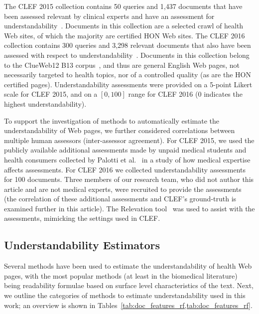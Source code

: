 \documentclass[10pt,a4paper]{article}
\begin{document}
The CLEF 2015 collection contains 50 queries and 1,437 documents that have been assessed relevant by clinical experts and have an assessment for understandability~\cite{clef15}. Documents in this collection are a selected crawl of health Web sites, of which the majority are certified HON Web sites.
The CLEF 2016 collection contains 300 queries and 3,298 relevant documents that also have been assessed with respect to understandability~\cite{clef16}. Documents in this collection belong to the ClueWeb12 B13 corpus~\cite{clueweb12}, and thus are general English Web pages, not necessarily targeted to health topics, nor of a controlled quality (as are the HON certified pages). 
Understandability assessments were provided on a 5-point Likert scale for CLEF 2015, and on a $[0,100]$ range for CLEF 2016 (0 indicates the highest understandability). 

To support the investigation of methods to automatically estimate the understandability of Web pages, 
we further considered correlations between multiple human assessors (inter-assessor agreement). For CLEF 2015, we used the publicly available additional assessments made by unpaid medical students and health consumers collected by Palotti et al.~\cite{palotti16b} in a study of how medical expertise affects assessments. For CLEF 2016 we  collected understandability assessments for 100 documents. 
Three members of our research team, who did not author this article and are not medical experts, were recruited to provide the assessments (the correlation of these additional assessments and CLEF's ground-truth is examined further in this article).
The Relevation tool~\cite{koopman14} was used to assist with the assessments, mimicking the settings used in CLEF. 


\subsection*{Understandability Estimators}
\label{sec:proxies}

Several methods have been used to estimate the understandability of health Web pages, with the most popular methods (at least in the biomedical literature) being readability formulae based on surface level characteristics of the text. Next, we outline the categories of methods to estimate understandability used in this work; an overview is shown in Tables~\ref{tab:doc_features_rf,tab:doc_features_rf}. %
\end{document}
